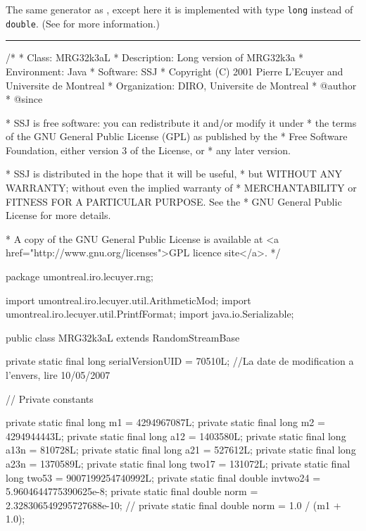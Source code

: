 

The same generator as , except here it is implemented
with type \texttt{long} instead of \texttt{double}.
(See  for more information.)


\bigskip\hrule

\begin{code}
\begin{hide}
/*
 * Class:        MRG32k3aL
 * Description:  Long version of MRG32k3a
 * Environment:  Java
 * Software:     SSJ
 * Copyright (C) 2001  Pierre L'Ecuyer and Universite de Montreal
 * Organization: DIRO, Universite de Montreal
 * @author
 * @since

 * SSJ is free software: you can redistribute it and/or modify it under
 * the terms of the GNU General Public License (GPL) as published by the
 * Free Software Foundation, either version 3 of the License, or
 * any later version.

 * SSJ is distributed in the hope that it will be useful,
 * but WITHOUT ANY WARRANTY; without even the implied warranty of
 * MERCHANTABILITY or FITNESS FOR A PARTICULAR PURPOSE.  See the
 * GNU General Public License for more details.

 * A copy of the GNU General Public License is available at
   <a href="http://www.gnu.org/licenses">GPL licence site</a>.
 */
\end{hide}
package umontreal.iro.lecuyer.rng; \begin{hide}

import umontreal.iro.lecuyer.util.ArithmeticMod;
import umontreal.iro.lecuyer.util.PrintfFormat;
import java.io.Serializable;
\end{hide}

public class MRG32k3aL extends RandomStreamBase \begin{hide} {

   private static final long serialVersionUID = 70510L;
   //La date de modification a l'envers, lire 10/05/2007

   // Private constants   %

   private static final long   m1     = 4294967087L;
   private static final long   m2     = 4294944443L;
   private static final long   a12    =  1403580L;
   private static final long   a13n   =   810728L;
   private static final long   a21    =   527612L;
   private static final long   a23n   =  1370589L;
   private static final long   two17  =   131072L;
   private static final long   two53  =  9007199254740992L;
   private static final double invtwo24 = 5.9604644775390625e-8;
   private static final double norm   = 2.328306549295727688e-10;
   //    private static final double norm   = 1.0 / (m1 + 1.0);


}
\end{hide}
\end{code}
